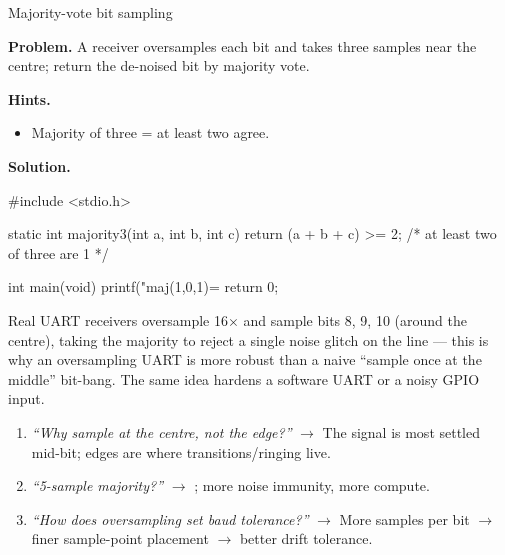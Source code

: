 \begin{gymproblem}{Majority-vote bit sampling}

\textbf{Problem.} A receiver oversamples each bit and takes three samples near
the centre; return the de-noised bit by majority vote.

\textbf{Hints.}
\begin{itemize}
\item Majority of three = at least two agree.
\end{itemize}

\attempt

\textbf{Solution.}
\begin{cgym}
#include <stdio.h>

static int majority3(int a, int b, int c) {
    return (a + b + c) >= 2;     /* at least two of three are 1 */
}

int main(void) {
    printf("maj(1,0,1)=%
    return 0;
}
\end{cgym}

Real UART receivers oversample 16$\times$ and sample bits 8, 9, 10 (around the
centre), taking the majority to reject a single noise glitch on the line ---
this is why an oversampling UART is more robust than a naive ``sample once at
the middle'' bit-bang. The same idea hardens a software UART or a noisy GPIO
input.

\followups
\begin{enumerate}
\item \emph{``Why sample at the centre, not the edge?''} $\rightarrow$ The
  signal is most settled mid-bit; edges are where transitions/ringing live.
\item \emph{``5-sample majority?''} $\rightarrow$ ; more noise
  immunity, more compute.
\item \emph{``How does oversampling set baud tolerance?''} $\rightarrow$ More
  samples per bit $\rightarrow$ finer sample-point placement $\rightarrow$
  better drift tolerance.
\end{enumerate}
\end{gymproblem}

